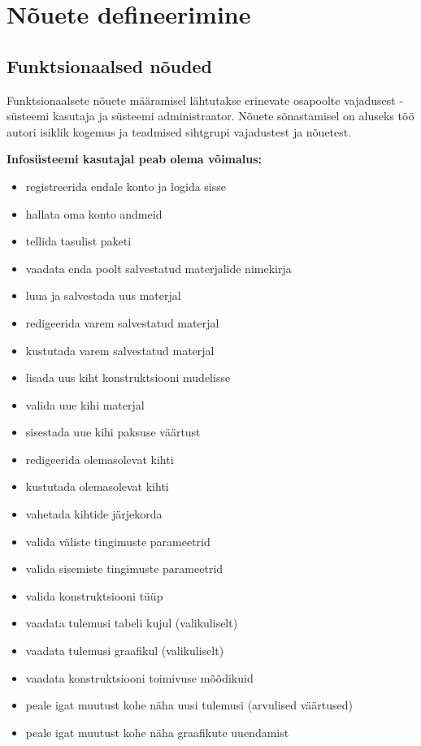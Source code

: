 \section{Nõuete defineerimine}
\label{chapters:analysis_requirements}
\subsection{Funktsionaalsed nõuded}
\label{subsec_func_req}
Funktsionaalsete nõuete määramisel lähtutakse erinevate osapoolte vajadusest - süsteemi kasutaja ja süsteemi 
administraator. Nõuete sõnastamisel on aluseks töö autori isiklik kogemus ja teadmised sihtgrupi vajadustest ja nõuetest.

\textbf{Infosüsteemi kasutajal peab olema võimalus:}
\begin{itemize}
    \item registreerida endale konto ja logida sisse
    \item hallata oma konto andmeid
    \item tellida tasulist paketi
    \item vaadata enda poolt salvestatud materjalide nimekirja
    \item luua ja salvestada uus materjal
    \item redigeerida varem salvestatud materjal
    \item kustutada varem salvestatud materjal
    \item lisada uus kiht konstruktsiooni mudelisse
    \item valida uue kihi materjal
    \item sisestada uue kihi paksuse väärtust
    \item redigeerida olemasolevat kihti
    \item kustutada olemasolevat kihti
    \item vahetada kihtide järjekorda
    \item valida väliste tingimuste parameetrid
    \item valida sisemiste tingimuste parameetrid
    \item valida konstruktsiooni tüüp
    \item vaadata tulemusi tabeli kujul (valikuliselt)
    \item vaadata tulemusi graafikul (valikuliselt)
    \item vaadata konstruktsiooni toimivuse mõõdikuid
    \item peale igat muutust kohe näha uusi tulemusi (arvulised väärtused)
    \item peale igat muutust kohe näha graafikute uuendamist

\end{itemize}
